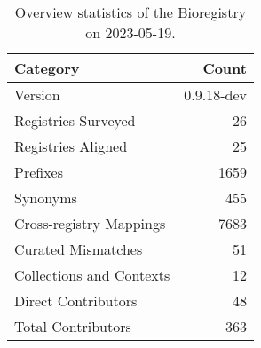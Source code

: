 \begin{table}
\caption{Overview statistics of the Bioregistry on 2023-05-19.}
\label{tab:bioregistry-summary}
\begin{tabular}{lr}
\toprule
Category & Count \\
\midrule
Version & 0.9.18-dev \\
Registries Surveyed & 26 \\
Registries Aligned & 25 \\
Prefixes & 1659 \\
Synonyms & 455 \\
Cross-registry Mappings & 7683 \\
Curated Mismatches & 51 \\
Collections and Contexts & 12 \\
Direct Contributors & 48 \\
Total Contributors & 363 \\
\bottomrule
\end{tabular}
\end{table}
